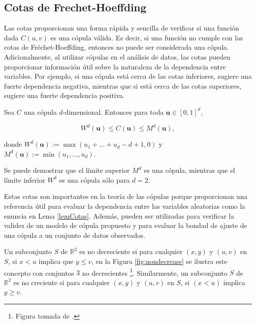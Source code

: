
\subsection{Cotas de Frechet-Hoeffding}

Las cotas proporcionan una forma rápida y sencilla de verificar si una función dada $C(u, v)$  es una cópula válida. Es decir, si una función no cumple con las cotas de Fréchet-Hoeffding, entonces no puede ser considerada una cópula. Adicionalmente, al utilizar cópulas en el análisis de datos, las cotas pueden proporcionar información útil sobre la naturaleza de la dependencia entre variables. Por ejemplo, si una cópula está cerca de las cotas inferiores, sugiere una fuerte dependencia negativa, mientras que si está cerca de las cotas superiores, sugiere una fuerte dependencia positiva.

\begin{defn}
    Sea $C$ una cópula $d$-dimensional. Entonces para toda $\boldsymbol{u} \in[0,1]^d$,

    \begin{equation}
        W^d(\boldsymbol{u}) \leq C(\boldsymbol{u}) \leq M^d(\boldsymbol{u}),
    \end{equation}

donde $W^d(\boldsymbol{u}):= \max \left(u_1+\ldots+u_d-d+1,0\right)$ y $M^d(\boldsymbol{u}):=\min \left(u_1, \ldots, u_d\right)$.
\end{defn}

Se puede demostrar que el límite superior $M^d$ es una cópula, mientras que el límite inferior $W^d$ es una cópula sólo para $d = 2$.

Estas cotas son importantes en la teoría de las cópulas porque proporcionan una referencia útil para evaluar la dependencia entre las variables aleatorias como la enuncia en Lema \ref{lemCotas}. Además, pueden ser utilizadas para verificar la validez de un modelo de cópula propuesto y para evaluar la bondad de ajuste de una cópula a un conjunto de datos observados.

\begin{defn}
    Un subconjunto $S$ de $\mathbb{R}^2$ es no decreciente si para cualquier $(x, y)$ y $(u, v)$ en $S$, si $x < u$ implica que $y \leq v$, en la Figura \ref{fig:nondecrease} se ilustra este concepto con conjuntos $3$ no decrecientes \footnote{Figura tomada de \cite{nelsenintroduction}.}. Similarmente, un subconjunto $S$ de $\mathbb{R}^2$ es no creciente si para cualquier $(x, y)$ y $(u, v)$ en $S$, si $(x < u)$ implica $y \geq v$. 
\end{defn}

